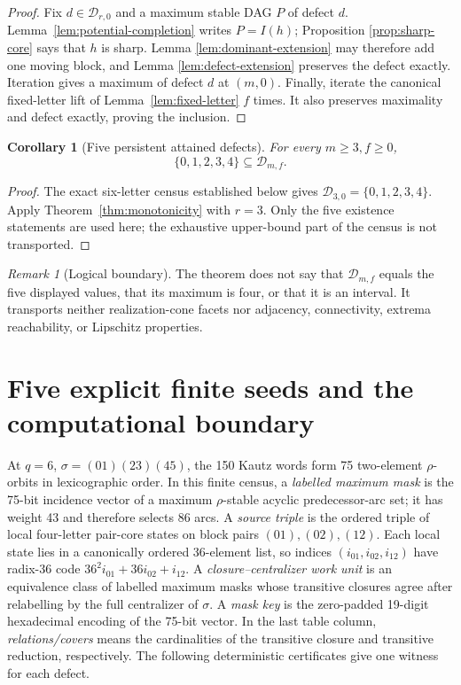 \documentclass[11pt,a4paper]{article}
\newtheorem{corollary}[theorem]{Corollary}
\theoremstyle{remark}
\newtheorem{remark}[theorem]{Remark}
\newcommand{\Dspec}{\mathcal D}
\begin{document}
\begin{proof}
Fix \(d\in\Dspec_{r,0}\) and a maximum stable DAG \(P\) of defect \(d\).
Lemma~\ref{lem:potential-completion} writes \(P=I(h)\); Proposition
\ref{prop:sharp-core} says that \(h\) is sharp.  Lemma
\ref{lem:dominant-extension} may therefore add one moving block, and Lemma
\ref{lem:defect-extension} preserves the defect exactly.  Iteration gives a
maximum of defect \(d\) at \((m,0)\).  Finally, iterate the canonical
fixed-letter lift of Lemma~\ref{lem:fixed-letter} \(f\) times.  It also
preserves maximality and defect exactly, proving the inclusion.
\end{proof}

\begin{corollary}[Five persistent attained defects]
\label{cor:five-defects}
For every \(m\geq3,f\geq0\),
\[
 \{0,1,2,3,4\}\subseteq\Dspec_{m,f}.
\]
\end{corollary}

\begin{proof}
The exact six-letter census established below gives
\(\Dspec_{3,0}=\{0,1,2,3,4\}\).  Apply
Theorem~\ref{thm:monotonicity} with \(r=3\).  Only the five existence
statements are used here; the exhaustive upper-bound part of the census is not
transported.
\end{proof}

\begin{remark}[Logical boundary]
The theorem does not say that \(\Dspec_{m,f}\) equals the five displayed
values, that its maximum is four, or that it is an interval.  It transports
neither realization-cone facets nor adjacency, connectivity, extrema
reachability, or Lipschitz properties.
\end{remark}

\section{Five explicit finite seeds and the computational boundary}
\label{sec:seeds}

At \(q=6\), \(\sigma=(01)(23)(45)\), the 150 Kautz words form 75
two-element \(\rho\)-orbits in lexicographic order.  In this finite census, a
\emph{labelled maximum mask} is the 75-bit incidence vector of a maximum
\(\rho\)-stable acyclic predecessor-arc set; it has weight 43 and therefore
selects 86 arcs.  A \emph{source triple} is the ordered triple of local
four-letter pair-core states on block pairs \((01),(02),(12)\).  Each local
state lies in a canonically ordered 36-element list, so indices
\((i_{01},i_{02},i_{12})\) have radix-36 code
\(36^2i_{01}+36i_{02}+i_{12}\).  A \emph{closure--centralizer work unit} is
an equivalence class of labelled maximum masks whose transitive closures
agree after relabelling by the full centralizer of \(\sigma\).  A
\emph{mask key} is the zero-padded 19-digit hexadecimal encoding of the
75-bit vector.  In the last table column, \emph{relations/covers} means the
cardinalities of the transitive closure and transitive reduction,
respectively.  The following deterministic certificates give one witness
for each defect.
\end{document}
